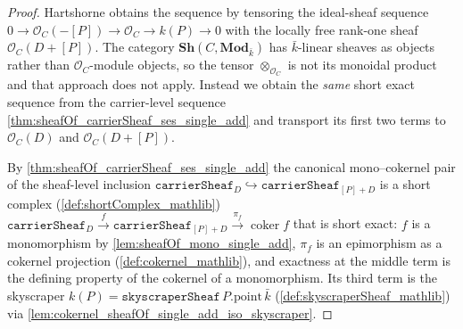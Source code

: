 \begin{proof}
  Hartshorne obtains the sequence by tensoring the ideal-sheaf sequence
  \(0 \to \mathcal O_C(-[P]) \to \mathcal O_C \to k(P) \to 0\) with the
  locally free rank-one sheaf \(\mathcal O_C(D+[P])\). The category
  \(\mathbf{Sh}(C, \mathbf{Mod}_{\bar k})\) has \(\bar k\)-linear sheaves
  as objects rather than \(\mathcal O_C\)-module objects, so the
  tensor \(\otimes_{\mathcal O_C}\) is not its monoidal product and that
  approach does not apply. Instead we obtain the \emph{same} short exact
  sequence from the carrier-level sequence
  \cref{thm:sheafOf_carrierSheaf_ses_single_add} and transport its first two
  terms to \(\mathcal O_C(D)\) and \(\mathcal O_C(D+[P])\).

  By \cref{thm:sheafOf_carrierSheaf_ses_single_add} the canonical mono--cokernel
  pair of the sheaf-level inclusion
  \(\texttt{carrierSheaf}_D \hookrightarrow \texttt{carrierSheaf}_{[P]+D}\) is a
  short complex (\cref{def:shortComplex_mathlib})
  \(\texttt{carrierSheaf}_D \xrightarrow{\ f\ } \texttt{carrierSheaf}_{[P]+D}
  \xrightarrow{\ \pi_f\ } \operatorname{coker} f\) that is short exact: \(f\) is a
  monomorphism by \cref{lem:sheafOf_mono_single_add}, \(\pi_f\) is an
  epimorphism as a cokernel projection (\cref{def:cokernel_mathlib}), and
  exactness at the middle term is the defining property of the cokernel of a
  monomorphism. Its third term is the skyscraper \(k(P) =
  \texttt{skyscraperSheaf}\,P.\mathrm{point}\,\bar k\)
  (\cref{def:skyscraperSheaf_mathlib}) via
  \cref{lem:cokernel_sheafOf_single_add_iso_skyscraper}.


\end{proof}
